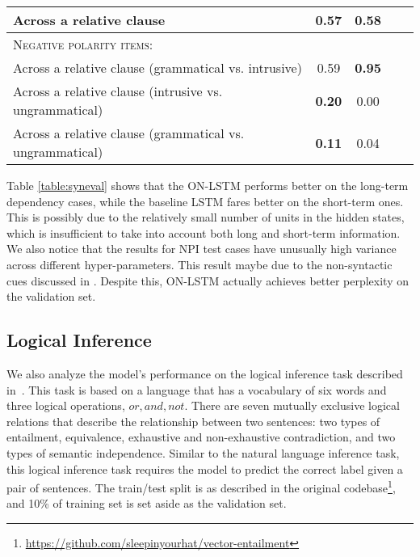 \documentclass{article} \usepackage{iclr2019_conference,times}
\begin{document}
\begin{table*}[t]
{\begin{tabular}{l c c c c}
Across a relative clause                        & 0.57 & \bf 0.58  \\
\midrule
\textsc{Negative polarity items:}\vspace{0.2em}\\
Across a relative clause (grammatical vs. intrusive)    & 0.59 & \bf 0.95  \\
Across a relative clause (intrusive vs. ungrammatical)    & \bf 0.20 & 0.00  \\
Across a relative clause (grammatical vs. ungrammatical)    & \bf 0.11 & 0.04  \\
\bottomrule
\end{tabular}
}
\caption{Overall accuracy for the ON-LSTM and LSTM on each test case. ``Long-term dependency'' means that an unrelated phrase (or a clause) exist between the targeted pair of words, while ``short-term dependency'' means there is no such distraction.}
\label{table:syneval}
\end{table*}

Table \ref{table:syneval} shows that the ON-LSTM performs better on the long-term dependency cases, while the baseline LSTM fares better on the short-term ones.
This is possibly due to the relatively small number of units in the hidden states, which is insufficient to take into account both long and short-term information.
We also notice that the results for NPI test cases have unusually high variance across different hyper-parameters.
This result maybe due to the non-syntactic cues discussed in \citet{marvin2018targeted}.
Despite this, ON-LSTM actually achieves better perplexity on the validation set.

\subsection{Logical Inference}
We also analyze the model's performance on the logical inference task described in~\citet{bowman2015tree}. 
This task is based on a language that has a vocabulary of six words and three logical operations, ${or, and, not}$. 
There are seven mutually exclusive logical relations that describe the relationship between two sentences: two types of entailment, equivalence, exhaustive and non-exhaustive contradiction, and two types of semantic independence. 
Similar to the natural language inference task, this logical inference task requires the model to predict the correct label given a pair of sentences.
The train/test split is as described in the original codebase\footnote{\url{https://github.com/sleepinyourhat/vector-entailment}}, and 10\% of training set is set aside as the validation set. 
\end{document}
